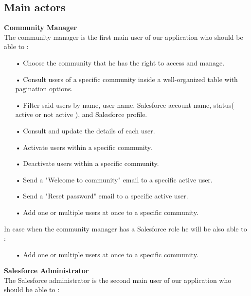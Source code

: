 \subsection*{Main actors}
\textbf{Community Manager}\\
The community manager is the first main user of our application who should be able to :
\begin{itemize}
\item[•] Choose the community that he has the right to access and manage.
\item[•] Consult users of a specific community inside a well-organized table with pagination options.
\item[•] Filter said users by name, user-name, Salesforce account name, status( active or not active ), and Salesforce profile.
\item[•] Consult and update the details of each user.
\item[•] Activate users within a specific community.
\item[•] Deactivate users within a specific community.
\item[•] Send a "Welcome to community" email to a specific active user.
\item[•] Send a "Reset password" email to a specific active user.
\item[•] Add one or multiple users at once to a specific community.
\end{itemize}
In case when the community manager has a Salesforce role he will be also able to :
\begin{itemize}
\item[•] Add one or multiple users at once to a specific community.
\end{itemize}
\textbf{Salesforce Administrator}\\
The Salesforce administrator is the second main user of our application who should be able to :
